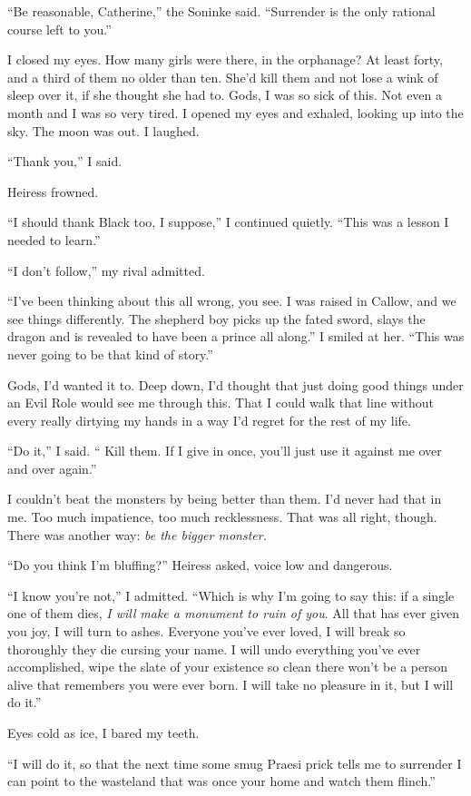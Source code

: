 \documentclass[12pt, openany]{book}
\begin{document}
“Be reasonable, Catherine,” the Soninke said. “Surrender is the only rational course left to you.”

I closed my eyes. How many girls were there, in the orphanage? At least forty, and a third of them no older than ten. She’d kill them and not lose a wink of sleep over it, if she thought she had to. Gods, I was so sick of this. Not even a month and I was so very tired. I opened my eyes and exhaled, looking up into the sky. The moon was out. I laughed.

“Thank you,” I said.

Heiress frowned.

“I should thank Black too, I suppose,” I continued quietly. “This was a lesson I needed to learn.”

“I don’t follow,” my rival admitted.

“I’ve been thinking about this all wrong, you see. I was raised in Callow, and we see things differently. The shepherd boy picks up the fated sword, slays the dragon and is revealed to have been a prince all along.” I smiled at her. “This was never going to be that kind of story.”

Gods, I’d wanted it to. Deep down, I’d thought that just doing good things under an Evil Role would see me through this. That I could walk that line without every really dirtying my hands in a way I’d regret for the rest of my life. 

“Do it,” I said. “ Kill them. If I give in once, you’ll just use it against me over and over again.”

I couldn’t beat the monsters by being better than them. I’d never had that in me. Too much impatience, too much recklessness. That was all right, though. There was another way: \textit{be the bigger monster.}

“Do you think I’m bluffing?” Heiress asked, voice low and dangerous.

“I know you’re not,” I admitted. “Which is why I’m going to say this: if a single one of them dies, \textit{I will} \textit{make a monument to ruin of you}. All that has ever given you joy, I will turn to ashes. Everyone you’ve ever loved, I will break so thoroughly they die cursing your name. I will undo everything you’ve ever accomplished, wipe the slate of your existence so clean there won’t be a person alive that remembers you were ever born. I will take no pleasure in it, but I will do it.”

Eyes cold as ice, I bared my teeth.

“I will do it, so that the next time some smug Praesi prick tells me to surrender I can point to the wasteland that was once your home and watch them flinch.”
\end{document}
